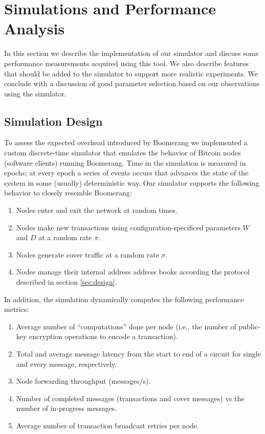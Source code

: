 \section{Simulations and Performance Analysis}
In this section we describe the implementation of our simulator and discuss some performance measurements acquired using this tool. We also describe features that should be added to the simulator to support more realistic experiments. We conclude with a discussion of good parameter selection based on our observations using the simulator.

\subsection{Simulation Design}
To assess the expected overhead introduced by Boomerang we implemented a custom discrete-time simulator that emulates the behavior of Bitcoin nodes (software clients) running Boomerang. Time in the simulation is measured in epochs; at every epoch a series of events occurs that advances the state of the system in some (usually) deterministic way. Our simulator supports the following behavior to closely resemble Boomerang:
\begin{enumerate}
	\item Nodes enter and exit the network at random times. 
	\item Nodes make new transactions using configuration-specificed parameters $W$ and $D$ at a random rate $\pi$.
	\item Nodes generate cover traffic at a random rate $\sigma$.
	\item Nodes manage their internal address address books according the protocol described in section \ref{sec:design}.
\end{enumerate}

In addition, the simulation dynamically computes the following performance metrics:
\begin{enumerate}
	\item Average number of ``computations'' done per node (i.e., the number of public-key encryption operations to encode a transaction).
	\item Total and average message latency from the start to end of a circuit for single and every message, respectively.
	\item Node forwarding throughput (messages/s).
	\item Number of completed messages (transactions and cover messages) vs the number of in-progress messages.
	\item Average number of transaction broadcast retries per node.
\end{enumerate}

